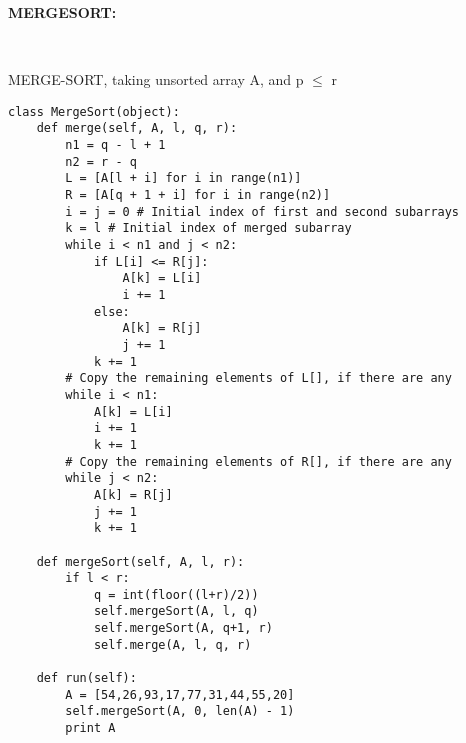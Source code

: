 \documentclass{article}
\begin{document}
\textbf{MERGESORT:} \\
    \begin{algorithm}
        \Indm{} \\
        \Indp
        \caption{MERGE-SORT, taking unsorted array A, and p $\leq$ r}
    \end{algorithm}
    \begin{verbatim}
class MergeSort(object):
    def merge(self, A, l, q, r):
        n1 = q - l + 1
        n2 = r - q
        L = [A[l + i] for i in range(n1)]
        R = [A[q + 1 + i] for i in range(n2)]
        i = j = 0 # Initial index of first and second subarrays
        k = l # Initial index of merged subarray
        while i < n1 and j < n2:
            if L[i] <= R[j]:
                A[k] = L[i]
                i += 1
            else:
                A[k] = R[j]
                j += 1
            k += 1
        # Copy the remaining elements of L[], if there are any
        while i < n1:
            A[k] = L[i]
            i += 1
            k += 1
        # Copy the remaining elements of R[], if there are any
        while j < n2:
            A[k] = R[j]
            j += 1
            k += 1

    def mergeSort(self, A, l, r):
        if l < r:
            q = int(floor((l+r)/2))
            self.mergeSort(A, l, q)
            self.mergeSort(A, q+1, r)
            self.merge(A, l, q, r)
            
    def run(self):
        A = [54,26,93,17,77,31,44,55,20]
        self.mergeSort(A, 0, len(A) - 1)
        print A
    \end{verbatim}
    
    
\end{document}
